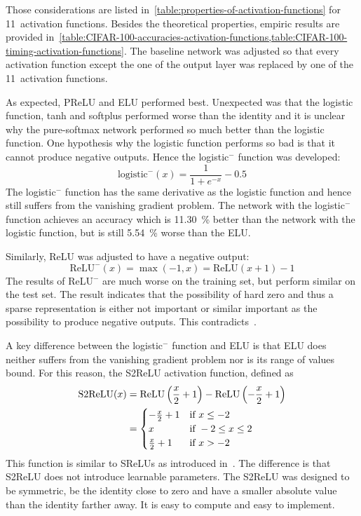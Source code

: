 Those considerations are listed
in~\cref{table:properties-of-activation-functions} for 11~activation functions.
Besides the theoretical properties, empiric results are provided
in~\cref{table:CIFAR-100-accuracies-activation-functions,table:CIFAR-100-timing-activation-functions}.
The baseline network was adjusted so that every activation function except the
one of the output layer was replaced by one of the 11~activation functions.

As expected, \gls{PReLU} and \gls{ELU} performed best. Unexpected was that the
logistic function, tanh and softplus performed worse than the identity and it
is unclear why the pure-softmax network performed so much better than the
logistic function.
One hypothesis why the logistic function performs so bad is that it cannot
produce negative outputs. Hence the logistic$^-$ function was developed:
\[\text{logistic}^{-}(x) = \frac{1}{1+ e^{-x}} - 0.5\]
The logistic$^-$ function has the same derivative as the logistic function and
hence still suffers from the vanishing gradient problem.
The network with the logistic$^-$ function achieves an accuracy which is
\SI{11.30}{\percent} better than the network with the logistic function, but is
still \SI{5.54}{\percent} worse than the \gls{ELU}.

Similarly, \gls{ReLU} was adjusted to have a negative output:
\[\text{ReLU}^{-}(x) = \max(-1, x) = \text{ReLU}(x+1) - 1\]
The results of \gls{ReLU}$^-$ are much worse on the training set, but perform
similar on the test set. The result indicates that the possibility of hard zero
and thus a sparse representation is either not important or similar important as
the possibility to produce negative outputs. This
contradicts~\cite{glorot2011deep,srivastava2014understanding}.

A key difference between the logistic$^-$ function and \gls{ELU} is that
\gls{ELU} does neither suffers from the vanishing gradient problem nor is its
range of values bound. For this reason, the S2ReLU activation function, defined
as
\begin{align*}
  \operatorname*{S2ReLU}(x) &= \operatorname*{ReLU} \left (\frac{x}{2} + 1 \right ) - \operatorname*{ReLU} \left (-\frac{x}{2} + 1 \right)\\
  &=
  \begin{cases}-\frac{x}{2} + 1 &\text{if } x \le -2\\
               x &\text{if } -2\le x \le 2\\
               \frac{x}{2} + 1&\text{if } x > -2\end{cases}
\end{align*}
This function is similar to SReLUs as introduced in~\cite{jin2016deep}. The
difference is that S2ReLU does not introduce learnable parameters. The S2ReLU
was designed to be symmetric, be the identity close to zero and have a smaller
absolute value than the identity farther away. It is easy to compute and easy to
implement.

